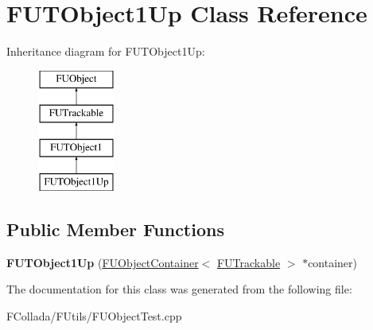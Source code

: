 \hypertarget{classFUTObject1Up}{
\section{FUTObject1Up Class Reference}
\label{classFUTObject1Up}
}
Inheritance diagram for FUTObject1Up:\begin{figure}[H]
\begin{center}
\leavevmode
\includegraphics[height=4.000000cm]{classFUTObject1Up}
\end{center}
\end{figure}
\subsection*{Public Member Functions}
\begin{DoxyCompactItemize}
\item 
\hypertarget{classFUTObject1Up_a85a928c41e49a2022d3b695beaf98ed2}{
{\bfseries FUTObject1Up} (\hyperlink{classFUObjectContainer}{FUObjectContainer}$<$ \hyperlink{classFUTrackable}{FUTrackable} $>$ $\ast$container)}
\label{classFUTObject1Up_a85a928c41e49a2022d3b695beaf98ed2}

\end{DoxyCompactItemize}


The documentation for this class was generated from the following file:\begin{DoxyCompactItemize}
\item 
FCollada/FUtils/FUObjectTest.cpp\end{DoxyCompactItemize}
